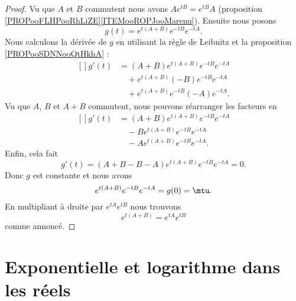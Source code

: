 \begin{proof}
	Vu que \( A\) et \( B\) commutent nous avons \( A e^{tB}= e^{tB}A\) (proposition \ref{PROPooFLHPooRhLiZE}\ref{ITEMooROPJooMarenu}). Ensuite nous posons
	\begin{equation}
		g(t)= e^{t(A+B)} e^{-tB} e^{-tA}.
	\end{equation}
	Nous calculons la dérivée de \( g\) en utilisant la règle de Leibnitz et la proposition \ref{PROPooSDNNooQtHkhA} :
	\begin{equation}
		\begin{aligned}[]
			g'(t) & =(A+B) e^{t(A+B)} e^{-tB} e^{-tA}        \\
			      & \quad + e^{t(A+B)}(-B) e^{-tB} e^{-tA}   \\
			      & \quad +  e^{t(A+B)} e^{-tB}(-A) e^{-tA}.
		\end{aligned}
	\end{equation}
	Vu que \( A\), \( B\) et \( A+B \) commutent, nous pouvons réarranger les facteurs en
	\begin{equation}
		\begin{aligned}[]
			g'(t) & =(A+B) e^{t(A+B)} e^{-tB} e^{-tA}     \\
			      & \quad -B e^{t(A+B)} e^{-tB} e^{-tA}   \\
			      & \quad -A  e^{t(A+B)} e^{-tB} e^{-tA}.
		\end{aligned}
	\end{equation}
	Enfin, cela fait
	\begin{equation}
		g'(t)=(A+B-B-A) e^{t(A+B)} e^{-tB} e^{-tA}=0.
	\end{equation}
	Donc \( g\) est constante et nous avons
	\begin{equation}
		e^{t(A+B)} e^{-tB} e^{-tA}=g(0)=\mtu.
	\end{equation}
	En multipliant à droite par \(  e^{tA} e^{tB}\) nous trouvons
	\begin{equation}
		e^{t(A+B)}= e^{tA} e^{tB}
	\end{equation}
	comme annoncé.
\end{proof}

\section{Exponentielle et logarithme dans les réels}

